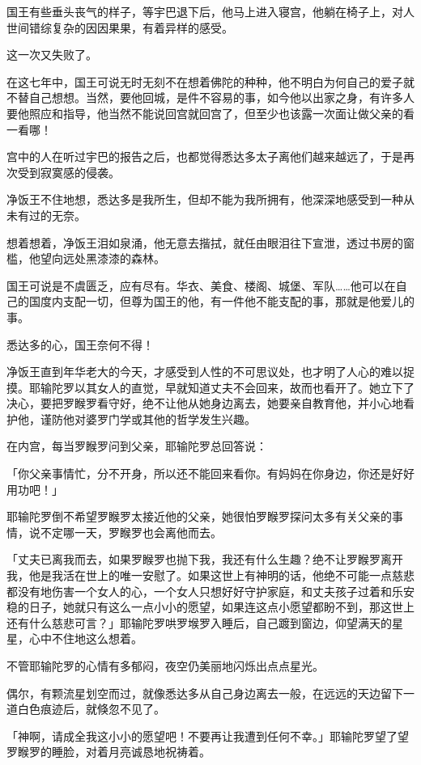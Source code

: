 \documentclass[twoside,openany]{book}
\begin{document}
国王有些垂头丧气的样子，等宇巴退下后，他马上进入寝宫，他躺在椅子上，对人世间错综复杂的因因果果，有着异样的感受。

这一次又失败了。

在这七年中，国王可说无时无刻不在想着佛陀的种种，他不明白为何自己的爱子就不替自己想想。当然，要他回城，是件不容易的事，如今他以出家之身，有许多人要他照应和指导，他当然不能说回宫就回宫了，但至少也该露一次面让做父亲的看一看哪！

宫中的人在听过宇巴的报告之后，也都觉得悉达多太子离他们越来越远了，于是再次受到寂寞感的侵袭。

净饭王不住地想，悉达多是我所生，但却不能为我所拥有，他深深地感受到一种从未有过的无奈。

想着想着，净饭王泪如泉涌，他无意去揩拭，就任由眼泪往下宣泄，透过书房的窗槛，他望向远处黑漆漆的森林。

国王可说是不虞匮乏，应有尽有。华衣、美食、楼阁、城堡、军队……他可以在自己的国度内支配一切，但尊为国王的他，有一件他不能支配的事，那就是他爱儿的事。

悉达多的心，国王奈何不得！

净饭王直到年华老大的今天，才感受到人性的不可思议处，也才明了人心的难以捉摸。耶输陀罗以其女人的直觉，早就知道丈夫不会回来，故而也看开了。她立下了决心，要把罗睺罗看守好，绝不让他从她身边离去，她要亲自教育他，并小心地看护他，谨防他对婆罗门学或其他的哲学发生兴趣。

在内宫，每当罗睺罗问到父亲，耶输陀罗总回答说：

「你父亲事情忙，分不开身，所以还不能回来看你。有妈妈在你身边，你还是好好用功吧！」

耶输陀罗倒不希望罗睺罗太接近他的父亲，她很怕罗睺罗探问太多有关父亲的事情，说不定哪一天，罗睺罗也会离他而去。

「丈夫已离我而去，如果罗睺罗也抛下我，我还有什么生趣？绝不让罗睺罗离开我，他是我活在世上的唯一安慰了。如果这世上有神明的话，他绝不可能一点慈悲都没有地伤害一个女人的心，一个女人只想好好守护家庭，和丈夫孩子过着和乐安稳的日子，她就只有这么一点小小的愿望，如果连这点小愿望都盼不到，那这世上还有什么慈悲可言？」耶输陀罗哄罗堠罗入睡后，自己踱到窗边，仰望满天的星星，心中不住地这么想着。

不管耶输陀罗的心情有多郁闷，夜空仍美丽地闪烁出点点星光。

偶尔，有颗流星划空而过，就像悉达多从自己身边离去一般，在远远的天边留下一道白色痕迹后，就倏忽不见了。

「神啊，请成全我这小小的愿望吧！不要再让我遭到任何不幸。」耶输陀罗望了望罗睺罗的睡脸，对着月亮诚恳地祝祷着。
\end{document}
